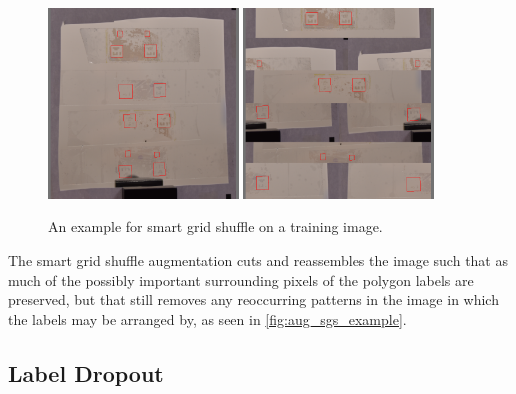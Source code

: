 \documentclass[10pt]{book}
\newcommand{\figureref}[1]{\autoref{#1}}
\begin{document}
\begin{figure}
  \centering
     {\includegraphics[width=0.45\textwidth]{image/aug_sgs_before}}
     {\includegraphics[width=0.45\textwidth]{image/aug_sgs_after}}
  \caption{An example for smart grid shuffle on a training image.}
  \label{fig:aug_sgs_example}
\end{figure}

The smart grid shuffle augmentation cuts and reassembles the image such that as much of the possibly important surrounding pixels of the polygon labels are preserved, but that still removes any reoccurring patterns in the image in which the labels may be arranged by, as seen in \figureref{fig:aug_sgs_example}.

\subsection{Label Dropout}
\label{sec:aug_ld}
\end{document}
